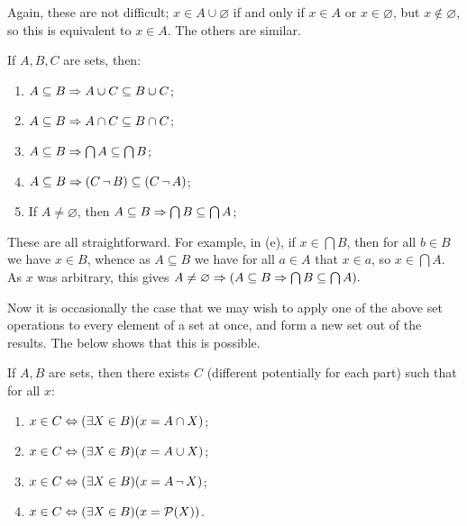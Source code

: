 \begin{prf}
Again, these are not difficult; $x\in A\cup \varnothing$ if and only if $x\in A$ or $x\in \varnothing$, but $x\notin\varnothing$, so this is equivalent to $x\in A$. The others are similar.
\end{prf}

\begin{thm}
\label{Thm:_Algebra_of_Sets_part_three}
If $A, B, C$ are sets, then: 

\begin{enumerate}[label = (\alph*)]
\item $A\subseteq B \Rightarrow A\cup C \subseteq B\cup C$; 
\item $A\subseteq B \Rightarrow A\cap C \subseteq B\cap C$;
\item $A\subseteq B \Rightarrow \bigcap A \subseteq \bigcap B$; 
\item $A\subseteq B \Rightarrow (C\, \lnot \, B) \subseteq (C \, \lnot \, A)$;
\item If $A\neq \varnothing$, then $A\subseteq B \Rightarrow \bigcap B \subseteq \bigcap A$;
\end{enumerate}

\end{thm}

\begin{prf}
These are all straightforward. For example, in (e), if $x\in \bigcap B$, then for all $b\in B$ we have $x\in B$, whence as $A\subseteq B$ we have for all $a\in A$ that $x\in a$, so $x\in\bigcap A$. As $x$ was arbitrary, this gives $A\neq \varnothing \Rightarrow (A\subseteq B \Rightarrow \bigcap B \subseteq \bigcap A).$  
\end{prf}

Now it is occasionally the case that we may wish to apply one of the above set operations to every element of a set at once, and form a new set out of the results. The below shows that this is possible.

\begin{thm}
\label{Thm:_Algebra_of_Sets_part_four}
If $A, B$ are sets, then there exists $C$ (different potentially for each part) such that for all $x$: 

\begin{enumerate}[label = (\alph*)]
\item $x\in C \Leftrightarrow (\exists X\in B)(x=A\cap X)$; 
\item $x\in C \Leftrightarrow (\exists X\in B)(x = A\cup X)$; 
\item $x\in C \Leftrightarrow (\exists X\in B)(x = A\, \lnot \, X)$;
\item $x\in C \Leftrightarrow (\exists X\in B)(x = \mathcal{P}(X))$.
\end{enumerate}
\end{thm}

